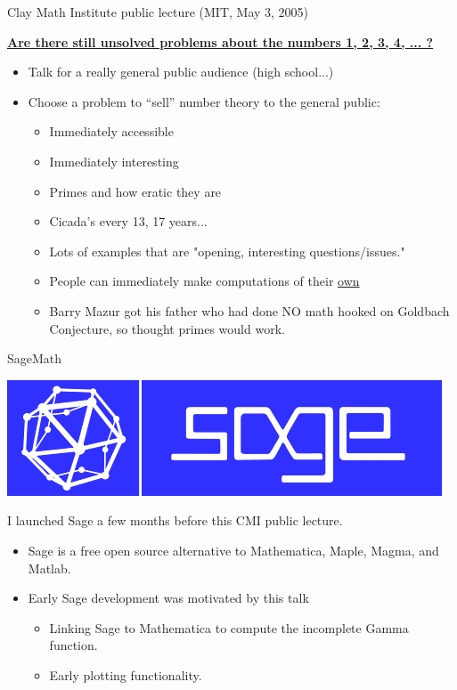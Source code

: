 \documentclass[draft]{beamer}
\begin{document}
\begin{frame}{Clay Math Institute public lecture (MIT, May 3, 2005)}

  \href{http://www.claymath.org/library/public\_lectures/mazur\_riemann\_hypothesis.pdf}{\bf Are there still unsolved problems about the numbers 1, 2, 3, 4, ... ?}
  \vfill

  \begin{itemize}
    \item  Talk for a really general public audience (high school...)
    \item  Choose a problem to ``sell'' number theory to the general public:
          \begin{itemize}
            \item   Immediately accessible
            \item   Immediately interesting
            \item   Primes and how eratic they are
            \item   Cicada's every 13, 17 years...
            \item   Lots of examples that are "opening, interesting questions/issues."
            \item   People can immediately make computations of their \underline{own}
            \item   Barry Mazur got his father who had done NO
                  math hooked on Goldbach Conjecture, so thought
                  primes would work.
          \end{itemize}
  \end{itemize}
\end{frame}

\begin{frame}{SageMath}
  \vfill
  \begin{center}
    \includegraphics[width=.5\textwidth]{pics/sage-logo.png}
  \end{center}
  \vfill

  I launched Sage a few months before this CMI public lecture.
  \begin{itemize}
    \item Sage is a free open source alternative to Mathematica, Maple, Magma, and Matlab.
    \item Early Sage development was motivated by this talk
          \begin{itemize}
            \item Linking Sage to Mathematica to compute the incomplete Gamma function.
            \item Early plotting functionality.
          \end{itemize}
  \end{itemize}
\end{frame}
\end{document}
